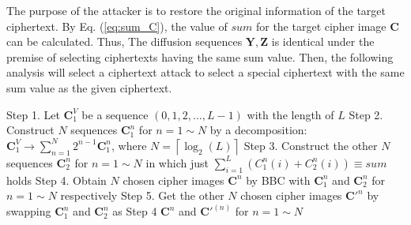 \documentclass[final,3p,times,twocolumn]{elsarticle}
\begin{document}
The purpose of the attacker is to restore the original information of the target ciphertext. By Eq. (\ref{eq:sum_C}), the value of $sum$ for the target cipher image $\bm{C}$ can be calculated. Thus, The diffusion sequences $\bm{Y},\bm{Z}$ is identical under the premise of selecting ciphertexts having the same sum value. Then, the following analysis will select a ciphertext attack to select a special ciphertext with the same sum value as the given ciphertext.


\begin{algorithm*}
	\label{alg1:construct_images} 
	\caption{The method of constructing some chosen cipher images for breaking the diffusion.}
	Step 1. Let $\bm{C}_1^{V}$ be a sequence $(0,1,2,...,L-1)$ with the length of $L$\;
	Step 2. Construct $N$ sequences $\bm{C}_1^{n}$ for $n=1\sim N$ by a decomposition: $\bm{C}_1^{V} \rightarrow \sum\limits_{n = 1}^{N} {2^{n - 1}\bm{C}_1^n}$, where $N=\left\lceil {\log_{2}(L)} \right\rceil$\;
	Step 3. Construct the other $N$ sequences $\bm{C}_2^{n}$ for $n=1\sim N$ in which just $\sum\limits_{i = 1}^{L} (C_1^n(i)+C_2^n(i)) \equiv  sum$ holds\;
	Step 4. Obtain $N$ chosen cipher images $\bm{C}^{n}$ by BBC with $\bm{C}_1^{n}$ and $\bm{C}_2^{n}$  for $n=1\sim N$ respectively \;
	Step 5. Get the other $N$ chosen cipher images $\bm{C}'^{n}$ by swapping $\bm{C}_1^{n}$ and $\bm{C}_2^{n}$ as Step 4\;
	\Return $\bm{C}^{n}$ and $\bm{C}'^{(n)}$ for $n=1\sim N$\;
\end{algorithm*}
\end{document}
